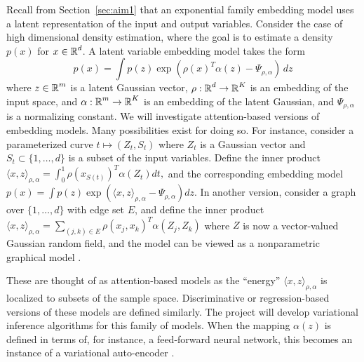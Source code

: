 Recall from Section~\ref{sec:aim1} that an exponential family
embedding model uses a latent representation of the input and output
variables. Consider the case of high dimensional density estimation,
where the goal is to estimate a density $p(x)$ for $x\in\mbox{$\mathbb{R}$}^d$.
A latent variable embedding model takes the form
$$ p(x) = \int p(z) \exp(\rho(x)^T \alpha(z) - \Psi_{\rho,\alpha}) \, dz$$
where $z\in \mbox{$\mathbb{R}$}^m$ is a latent Gaussian vector,
$\rho:\mbox{$\mathbb{R}$}^d \to \mbox{$\mathbb{R}$}^K$ is an embedding of the input space,
and $\alpha: \mbox{$\mathbb{R}$}^m \to\mbox{$\mathbb{R}$}^K$ is an embedding of the latent
Gaussian, and $\Psi_{\rho,\alpha}$ is a normalizing constant.
We will investigate attention-based versions of embedding
models. Many possibilities exist for doing so. For instance, consider a parameterized curve $t\mapsto (Z_t, S_t)$
where $Z_t$ is a Gaussian vector and $S_t \subset \{1,\ldots, d\}$
is a subset of the input variables. Define the inner product 
$\langle x, z\rangle_{\rho,\alpha}
= \int_{0}^1 \rho\left(x_{S(t)}\right)^T \alpha(Z_t) dt,$
and the corresponding embedding model
$ p(x) = \int p(z) \exp\left(\langle x, z\rangle_{\rho,\alpha} - \Psi_{\rho,\alpha}\right) dz.$
In another version, consider a graph over $\{1,\ldots, d\}$ with edge
set $E$, and define the inner product
$\langle x, z\rangle_{\rho,\alpha}
= \sum_{(j,k)\in E} \rho(x_j, x_k)^T \alpha(Z_j, Z_k)$
where $Z$ is now a vector-valued Gaussian random field, 
and the model can be viewed as a nonparametric graphical model
\citep{hl18}.

These are thought of as attention-based models as the ``energy''
$\langle x, z\rangle_{\rho,\alpha}$ is localized to subsets of the
sample space. Discriminative or regression-based versions of these
models are defined similarly. The project will develop variational
inference algorithms for this family of models. When the mapping 
$\alpha(z)$ is defined in terms of, for instance, a feed-forward
neural network, this becomes an instance of a variational auto-encoder
\citep{kingma13}.


\vskip20pt







 
